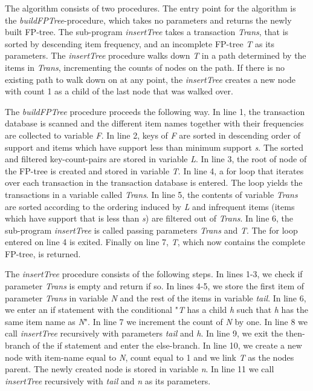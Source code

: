 The algorithm consists of two procedures. The entry point for the algorithm is the \textit{buildFPTree}-procedure, which takes no parameters and returns the newly built FP-tree. The sub-program \textit{insertTree} takes a transaction \textit{Trans}, that is sorted by descending item frequency, and an incomplete FP-tree \textit{T} as its parameters. The \textit{insertTree} procedure walks down \textit{T} in a path determined by the items in \textit{Trans}, incrementing the counts of nodes on the path. If there is no existing path to walk down on at any point, the \textit{insertTree} creates a new node with count 1 as a child of the last node that was walked over.

The \textit{buildFPTree} procedure proceeds the following way. In line 1, the transaction database is scanned and the different item names together with their frequencies are collected to variable \textit{F}. In line 2, keys of \textit{F} are sorted in descending order of support and items which have support less than minimum support \textit{s}. The sorted and filtered key-count-pairs are stored in variable \textit{L}. In line 3, the root of node of the FP-tree is created and stored in variable \textit{T}. In line 4, a for loop that iterates over each transaction in the transaction database is entered. The loop yields the transactions in a variable called \textit{Trans}. In line 5, the contents of variable \textit{Trans} are sorted according to the ordering induced by \textit{L} and infrequent items (items which have support that is less than \textit{s}) are filtered out of \textit{Trans}. In line 6, the sub-program \textit{insertTree} is called passing parameters \textit{Trans} and \textit{T}. The for loop entered on line 4 is exited. Finally on line 7, \textit{T}, which now contains the complete FP-tree, is returned.  

The \textit{insertTree} procedure consists of the following steps. In lines 1-3, we check if parameter \textit{Trans} is empty and return if so. In lines 4-5, we store the first item of parameter \textit{Trans} in variable \textit{N} and the rest of the items in variable \textit{tail}. In line 6, we enter an if statement with the conditional "\textit{T} has a child \textit{h} such that \textit{h} has the same item name as \textit{N}". In line 7 we increment the count of \textit{N} by one. In line 8 we call \textit{insertTree} recursively with parameters \textit{tail} and \textit{h}. In line 9, we exit the then-branch of the if statement and enter the else-branch. In line 10, we create a new node with item-name equal to \textit{N}, count equal to 1 and we link \textit{T} as the nodes parent. The newly created node is stored in variable \textit{n}. In line 11 we call \textit{insertTree} recursively with \textit{tail} and \textit{n} as its parameters.

